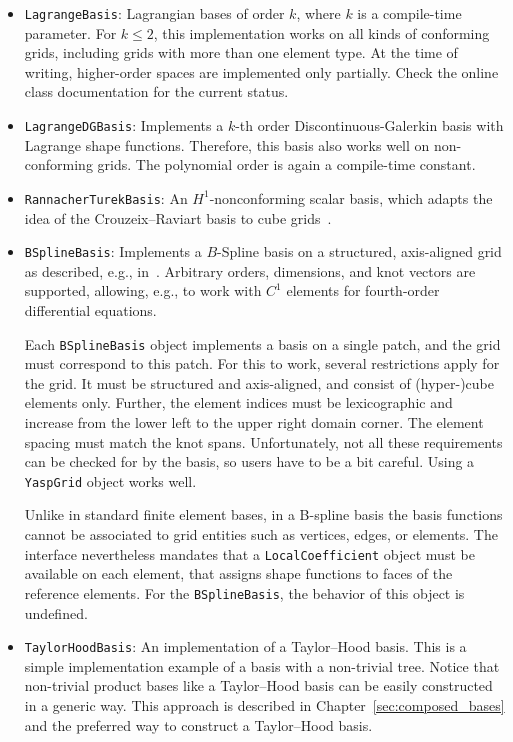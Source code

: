 \documentclass[a4paper,10pt,headings=normal,bibliography=totoc]{scrartcl}
\newcommand{\cpp}[1]{\lstinline[basicstyle=\ttfamily]!#1!}
\begin{document}
\begin{itemize}
 \item \cpp{LagrangeBasis}: Lagrangian bases of order $k$, where $k$ is a compile-time parameter.
   For $k\le 2$, this implementation works on all kinds of conforming grids, including grids with more
   than one element type.  At the time of writing, higher-order spaces are implemented only partially.
   Check the online class documentation for the current status.

 \item \cpp{LagrangeDGBasis}: Implements a $k$-th order Discontinuous-Galerkin basis with Lagrange shape functions.
   Therefore, this basis also
   works well on non-conforming grids.  The polynomial order is again a compile-time constant.

 \item \cpp{RannacherTurekBasis}: An $H^1$-nonconforming scalar basis, which adapts the idea
   of the Crouzeix--Raviart basis to cube grids~\cite{rannacher_turek:1992}.

 \item \cpp{BSplineBasis}:  Implements a $B$-Spline basis on a structured, axis-aligned grid as described,
   e.g., in~\cite{cottrell_hughes_bazilevs:2009}.  Arbitrary orders, dimensions, and knot vectors are supported,
   allowing, e.g., to work with $C^1$ elements for fourth-order differential equations.

   Each \cpp{BSplineBasis} object implements a basis on a single patch, and the grid must correspond to this
   patch. For this to work, several restrictions apply for the grid.  It must be structured and axis-aligned,
   and consist of (hyper-)cube elements only.  Further, the element indices must be lexicographic and
   increase from the lower left to the upper right domain corner.  The element spacing must match the knot spans.
   Unfortunately, not all these requirements can be checked for by the basis, so users have to be a bit
   careful.  Using a \cpp{YaspGrid} object works well.

   Unlike in standard finite element bases, in a B-spline basis the basis functions cannot be associated
   to grid entities such as vertices, edges, or elements.  The interface nevertheless mandates that a
   \cpp{LocalCoefficient} object must be available on each element, that assigns shape functions
   to faces of the reference elements. For the \cpp{BSplineBasis}, the behavior of this
   object is undefined.

 \item \cpp{TaylorHoodBasis}:
   An implementation of a Taylor--Hood basis.
   This is a simple implementation example of a basis with a non-trivial tree.
   Notice that non-trivial product bases like a Taylor--Hood basis
   can be easily constructed in a generic way. This approach is described
   in Chapter~\ref{sec:composed_bases} and the preferred way to construct
   a Taylor--Hood basis.
\end{itemize}
\end{document}
